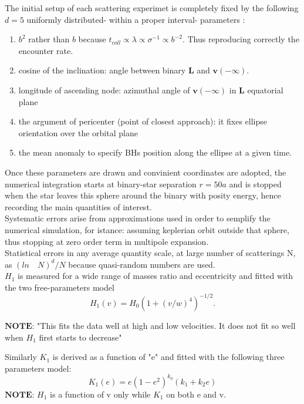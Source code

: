 \documentclass[12pt,twoside,openany]{book}
\begin{document}
The initial setup of each scattering experimet is completely fixed by the following $d=5$ uniformly distributed- within a proper interval- parameters :
\begin{enumerate}
    \item $b^2$ rather than $b$ because $t_{coll}\propto \lambda\propto \sigma^{-1}\propto b^{-2}$. Thus reproducing correctly the encounter rate.
    \item  cosine of the inclination: angle between binary $\mathbf{L}$ and $\mathbf{v}(-\infty)$.
    \item  longitude of ascending node: azimuthal angle of $\mathbf{v}(-\infty)$ in $\mathbf{L}$ equatorial plane
    \item  the argument of pericenter (point of closest approach): it fixes ellipse orientation over the orbital plane
    \item  the mean anomaly to specify BHs position along the ellipse at a given time.

\end{enumerate}

Once these parameters are drawn and convinient coordinates are adopted, the numerical integration starts at binary-star separation $r=50a$ and is stopped when the star leaves this sphere around the binary with posity energy, hence recording the main quantities of interest.\\Systematic errors arise from approximations used in order to semplify the numerical simulation, for istance: assuming keplerian orbit outside that sphere, thus stopping at zero order term in multipole expansion.\\Statistical errors in any average quantity scale, at large number of scatterings N, as $(ln\quad N)^d/N$ because quasi-random numbers are used.\\$H_1$ is measured for a wide range of masses ratio and eccentricity and fitted with the two free-parameters model
\begin{equation}
    H_1(v)=H_0(1+(v/w)^4)^{-1/2}.
\end{equation}




$\mathbf{NOTE}$: "This fits the data well at high and low velocities. It does not fit so well when $H_1$ first starts to decrease"

Similarly $K_1$ is derived as a function of "e" and fitted with the following three parameters model:
\begin{equation}
    K_1(e)=e(1-e^2)^{k_0}(k_1+k_2e)
\end{equation}
$\mathbf{NOTE}$: $H_1$ is a function of v only while $K_1$ on both e and v.
\end{document}
